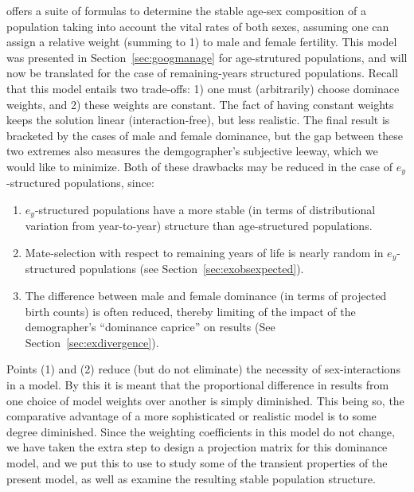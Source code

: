  \FloatBarrier
 
\citet{goodman1967age} offers a suite of
formulas to determine the stable age-sex composition of a population taking into
account the vital rates of both sexes, assuming one can assign a relative weight
(summing to 1) to male and female fertility. This model was presented in
Section~\ref{sec:googmanage} for age-strutured populations, and will now be
translated for the case of remaining-years structured populations. Recall that
this model entails two trade-offs: 1) one must (arbitrarily) choose dominace
weights, and 2) these weights are constant. The fact of having constant weights 
keeps the solution linear (interaction-free), but less realistic. The final result is bracketed by the
cases of male and female dominance, but the gap between these two extremes 
also measures the demgographer's subjective leeway, which we would like to
minimize. Both of these drawbacks may be reduced in the case of $e_y$-structured
populations, since: 
\begin{enumerate}
  \item $e_y$-structured populations have a more stable (in terms of
  distributional variation from year-to-year) structure than age-structured
  populations.
  \item Mate-selection with respect to remaining years of
life is nearly random in $e_y$-structured populations (see
Section~\ref{sec:exobsexpected}).
  \item The difference between male and female dominance (in terms of projected
birth counts) is often reduced, thereby limiting of the impact of the
demographer's ``dominance caprice'' on results (See
Section~\ref{sec:exdivergence}).
\end{enumerate}
Points (1) and (2) reduce (but do
not eliminate) the necessity of sex-interactions in a model. By this it is meant
that the proportional difference in results from one choice of model weights
over another is simply diminished. This being so, the comparative advantage of a
more sophisticated or realistic model is to some degree diminished. Since the
weighting coefficients in this model do not change, we have taken the extra step
to design a projection matrix for this dominance model, and we put this to use
to study some of the transient properties of the present model, as well as
examine the resulting stable population structure.
